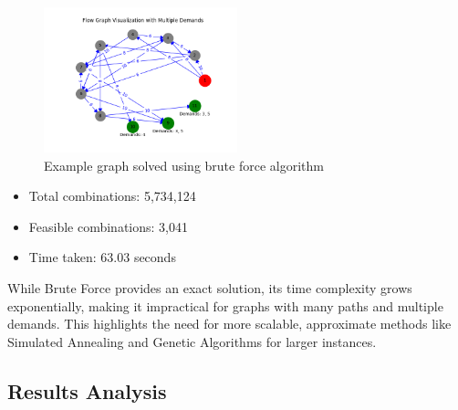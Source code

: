 \documentclass[a4paper,12pt]{article}
\begin{document}
\begin{figure}[H]
    \centering
    \includegraphics[width=0.5\textwidth]{brute-force-example.png}
    \caption{Example graph solved using brute force algorithm}
\end{figure}

\begin{itemize}
    \item Total combinations: 5,734,124
    \item Feasible combinations: 3,041
    \item Time taken: 63.03 seconds
\end{itemize}

\noindent  While Brute Force provides an exact solution, its time complexity grows exponentially, making it impractical for graphs with many paths and multiple demands. This highlights the need for more scalable, approximate methods like Simulated Annealing and Genetic Algorithms for larger instances.

\subsection{Results Analysis}

\end{document}
